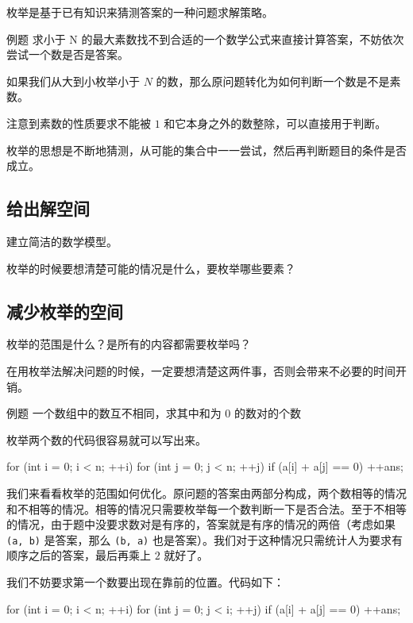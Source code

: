 
枚举是基于已有知识来猜测答案的一种问题求解策略。

\begin{NOTE}{例题}{}
求小于 N 的最大素数找不到合适的一个数学公式来直接计算答案，不妨依次尝试一个数是否是答案。
\end{NOTE}


如果我们从大到小枚举小于 $N$ 的数，那么原问题转化为如何判断一个数是不是素数。

注意到素数的性质要求不能被 $1$ 和它本身之外的数整除，可以直接用于判断。

枚举的思想是不断地猜测，从可能的集合中一一尝试，然后再判断题目的条件是否成立。

\subsection{给出解空间}

建立简洁的数学模型。

枚举的时候要想清楚可能的情况是什么，要枚举哪些要素？

\subsection{减少枚举的空间}

枚举的范围是什么？是所有的内容都需要枚举吗？

在用枚举法解决问题的时候，一定要想清楚这两件事，否则会带来不必要的时间开销。

\begin{NOTE}{例题}{}
一个数组中的数互不相同，求其中和为 $0$ 的数对的个数
\end{NOTE}


枚举两个数的代码很容易就可以写出来。

\begin{cppcode}
for (int i = 0; i < n; ++i)
  for (int j = 0; j < n; ++j)
    if (a[i] + a[j] == 0) ++ans;
\end{cppcode}

我们来看看枚举的范围如何优化。原问题的答案由两部分构成，两个数相等的情况和不相等的情况。相等的情况只需要枚举每一个数判断一下是否合法。至于不相等的情况，由于题中没要求数对是有序的，答案就是有序的情况的两倍（考虑如果 \texttt{(a, b)} 是答案，那么 \texttt{(b, a)} 也是答案）。我们对于这种情况只需统计人为要求有顺序之后的答案，最后再乘上 $2$ 就好了。

我们不妨要求第一个数要出现在靠前的位置。代码如下：

\begin{cppcode}
for (int i = 0; i < n; ++i)
  for (int j = 0; j < i; ++j)
    if (a[i] + a[j] == 0) ++ans;
\end{cppcode}

